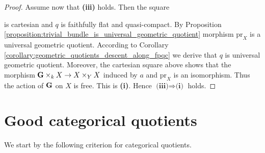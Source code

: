 \begin{proof}
Assume now that \textbf{(iii)} holds. Then the square
\begin{center}
\end{center}
is cartesian and $q$ is faithfully flat and quasi-compact. By Proposition \ref{proposition:trivial_bundle_is_universal_geometric_quotient} morphism $\mathrm{pr}_X$ is a universal geometric quotient. According to Corollary \ref{corollary:geometric_quotients_descent_along_fpqc} we derive that $q$ is universal geometric quotient. Moreover, the cartesian square above shows that the morphism $\mathbf{G}\times_kX\rightarrow X\times_YX$ induced by $a$ and $\mathrm{pr}_X$ is an isomorphism. Thus the action of $\mathbf{G}$ on $X$ is free. This is \textbf{(i)}. Hence $\textbf{(iii)}\Rightarrow \textbf{(i)}$ holds.
\end{proof}

\section{Good categorical quotients}
\noindent
We start by the following criterion for categorical quotients.

